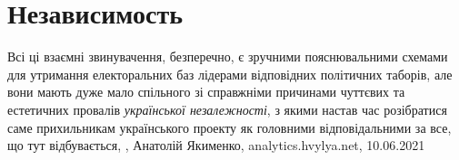  
 
 
 
 
\chapter{Независимость}
\label{sec:slova.nezavisimost}

Всі ці взаємні звинувачення, безперечно, є зручними пояснювальними схемами для
утримання електоральних баз лідерами відповідних політичних таборів, але вони
мають дуже мало спільного зі справжніми причинами чуттєвих та естетичних
провалів \emph{української незалежності}, з якими настав час розібратися саме
прихильникам українського проекту як головними відповідальними за все, що тут
відбувається,
, Анатолій Якименко, analytics.hvylya.net, 10.06.2021

